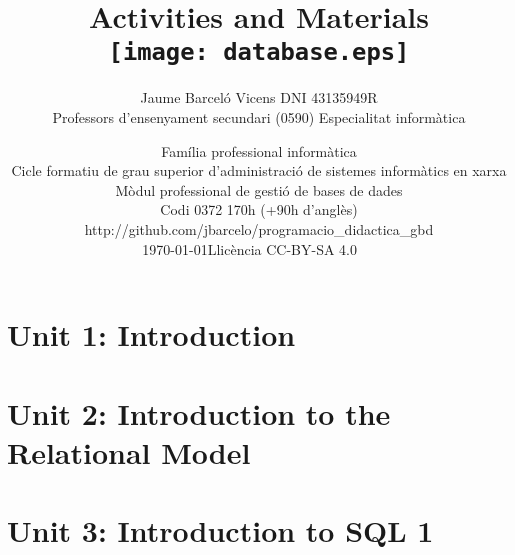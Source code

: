 \documentclass[catalan, a4paper, 12pt, titlepage]{article}
\title{Activities and Materials\\ 
	\vspace{1cm}
	\texttt{[image: database.eps]}
	}
\author{
	Jaume Barceló Vicens
	DNI 43135949R\\
	Professors d'ensenyament secundari (0590)
	Especialitat informàtica}
\date{
	Família professional informàtica \\
	Cicle formatiu de grau superior d’administració de sistemes informàtics en xarxa\\
	Mòdul professional de gestió de bases de dades\\
	Codi 0372 170h (+90h d'anglès)\\
	http://github.com/jbarcelo/programacio\_didactica\_gbd \\
	\faCalendar*[regular] \today \qquad  Llicència CC-BY-SA 4.0 \faCreativeCommons\ \faCreativeCommonsBy\ \faCreativeCommonsSa}
\begin{document}
\pagestyle{empty}

\maketitle

\tableofcontents

\newpage

\pagestyle{fancy}

\section{Unit 1: Introduction}

%




\section{Unit 2: Introduction to the Relational Model}

%






\section{Unit 3: Introduction to SQL 1}

%





\end{document}
